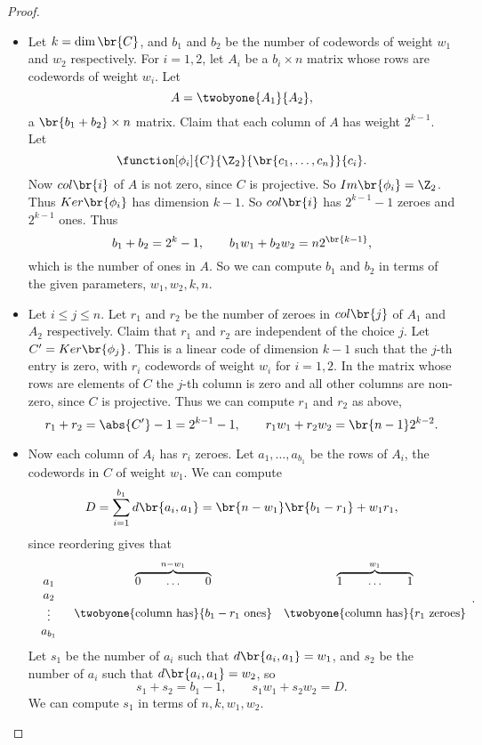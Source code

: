 \begin{proof}
\hfill
\begin{itemize}
\item Let $ k = \dim\br{C} $, and $ b_1 $ and $ b_2 $ be the number of codewords of weight $ w_1 $ and $ w_2 $ respectively. For $ i = 1, 2 $, let $ A_i $ be a $ b_i \times n $ matrix whose rows are codewords of weight $ w_i $. Let
$$ A = \twobyone{A_1}{A_2}, $$
a $ \br{b_1 + b_2} \times n $ matrix. Claim that each column of $ A $ has weight $ 2^{k - 1} $. Let
$$ \function[\phi_i]{C}{\Z_2}{\br{c_1, \dots, c_n}}{c_i}. $$
Now $ col\br{i} $ of $ A $ is not zero, since $ C $ is projective. So $ Im\br{\phi_i} = \Z_2 $. Thus $ Ker\br{\phi_i} $ has dimension $ k - 1 $. So $ col\br{i} $ has $ 2^{k - 1} - 1 $ zeroes and $ 2^{k - 1} $ ones. Thus
$$ b_1 + b_2 = 2^k - 1, \qquad b_1w_1 + b_2w_2 = n2^{\br{k - 1}}, $$
which is the number of ones in $ A $. So we can compute $ b_1 $ and $ b_2 $ in terms of the given parameters, $ w_1, w_2, k, n $.
\item Let $ i \le j \le n $. Let $ r_1 $ and $ r_2 $ be the number of zeroes in $ col\br{j} $ of $ A_1 $ and $ A_2 $ respectively. Claim that $ r_1 $ and $ r_2 $ are independent of the choice $ j $. Let $ C' = Ker\br{\phi_j} $. This is a linear code of dimension $ k - 1 $ such that the $ j $-th entry is zero, with $ r_i $ codewords of weight $ w_i $ for $ i = 1, 2 $. In the matrix whose rows are elements of $ C $ the $ j $-th column is zero and all other columns are non-zero, since $ C $ is projective. Thus we can compute $ r_1 $ and $ r_2 $ as above,
$$ r_1 + r_2 = \abs{C'} - 1 = 2^{k - 1} - 1, \qquad r_1w_1 + r_2w_2 = \br{n - 1}2^{k - 2}. $$
\item Now each column of $ A_i $ has $ r_i $ zeroes. Let $ a_1, \dots, a_{b_1} $ be the rows of $ A_i $, the codewords in $ C $ of weight $ w_1 $. We can compute
$$ D = \sum_{i = 1}^{b_1} d\br{a_i, a_1} = \br{n - w_1}\br{b_1 - r_1} + w_1r_1, $$
since reordering gives that
$$
\begin{array}{ccc}
a_1 & \overbrace{0 \qquad \dots \qquad 0}^{n - w_1} & \overbrace{1 \qquad \dots \qquad 1}^{w_1} \\
\begin{array}{c}
a_2 \\
\vdots \\
a_{b_1}
\end{array}
& \twobyone{\text{column has}}{b_1 - r_1 \ \text{ones}} & \twobyone{\text{column has}}{r_1 \ \text{zeroes}}
\end{array}.
$$
Let $ s_1 $ be the number of $ a_i $ such that $ d\br{a_i, a_1} = w_1 $, and $ s_2 $ be the number of $ a_i $ such that $ d\br{a_i, a_1} = w_2 $, so
$$ s_1 + s_2 = b_1 - 1, \qquad s_1w_1 + s_2w_2 = D. $$
We can compute $ s_1 $ in terms of $ n, k, w_1, w_2 $.


\end{itemize}
\end{proof}
